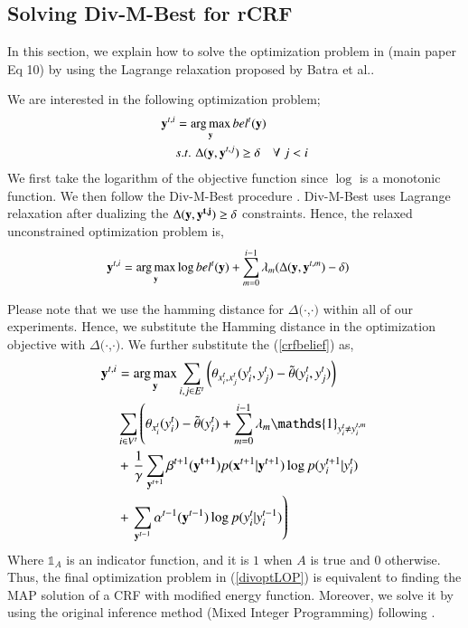 \subsection{Solving Div-M-Best for rCRF}
In this section, we explain how to solve the optimization problem in (main paper Eq 10) by using the Lagrange relaxation proposed by Batra et al.\cite{divmbest}.

We are interested in the following optimization problem;
\begin{equation}
\begin{aligned}
\mathbf{y}^{t,i} &= \operatorname*{arg\,max}_{\mathbf{y}}  bel^t(\mathbf{y}) \\
&s.t.\,\, \Delta(\mathbf{y},\mathbf{y}^{t,j}) \geq \delta \quad \forall \; {j < i}
\end{aligned}
\label{divopt}
\end{equation}
We first take the logarithm of the objective function since $\log$ is a monotonic function. We then follow the Div-M-Best procedure \cite{divmbest}. Div-M-Best uses Lagrange relaxation after dualizing the $\Delta(\bf{y},\bf{y}^{t,j}) \geq \delta$ constraints. Hence, the relaxed unconstrained optimization problem is,
\begin{equation}
\begin{aligned}
\mathbf{y}^{t,i} &= \operatorname*{arg\,max}_{\mathbf{y}}  \log bel^t(\mathbf{y}) + \sum_{m=0}^{i-1} \lambda_m (\Delta(\mathbf{y},\mathbf{y}^{t,m}) - \delta)
\end{aligned}
\label{divoptL}
\end{equation}

Please note that we use the hamming distance for $\Delta(\cdot$,$\cdot)$ within all of our experiments. Hence, we substitute the Hamming distance in the optimization objective with $\Delta(\cdot$,$\cdot)$. We further substitute the (\ref{crfbelief})  as,
\begin{equation}\small
\begin{aligned}
\mathbf{y}^{t,i} &= \argmax_{\mathbf{y}}  \sum_{i,j \in E^t} \left( \theta_{x^t_i,x^t_j}(y^t_i,y^t_j) - \tilde{\theta}(y^t_i,y^t_j) \right) \\
&\sum_{i \in V^t} \left( \theta_{x^t_i}(y^t_i) - \tilde{\theta}(y^t_i) + \sum_{m=0}^{i-1} \lambda_m \mathds{1}_{y^{t}_i \neq y^{t,m}_i} \right. \\
&+\left.\frac{1}{\gamma}\sum_{\mathbf{y}^{t+1}} \beta^{t+1}(\mathbf{y^{t+1}}) p(\mathbf{x}^{t+1}|\mathbf{y}^{t+1}) \log p(y^{t+1}_i|y^{t}_i)  \right.\\
&+ \left.  \sum_{\mathbf{y}^{t-1}} \alpha^{t-1}(\mathbf{y}^{t-1}) \log p(y^t_i|y^{t-1}_i) \right)
\end{aligned}
\label{divoptLOP}
\end{equation}
Where $\mathds{1}_A$ is an indicator function, and it is $1$ when $A$ is true and $0$ otherwise. Thus, the final optimization problem in (\ref{divoptLOP}) is equivalent to finding the MAP solution of a CRF with modified energy function. Moreover, we solve it by using the original inference method (Mixed Integer Programming) following \cite{hemaIJRR}.
